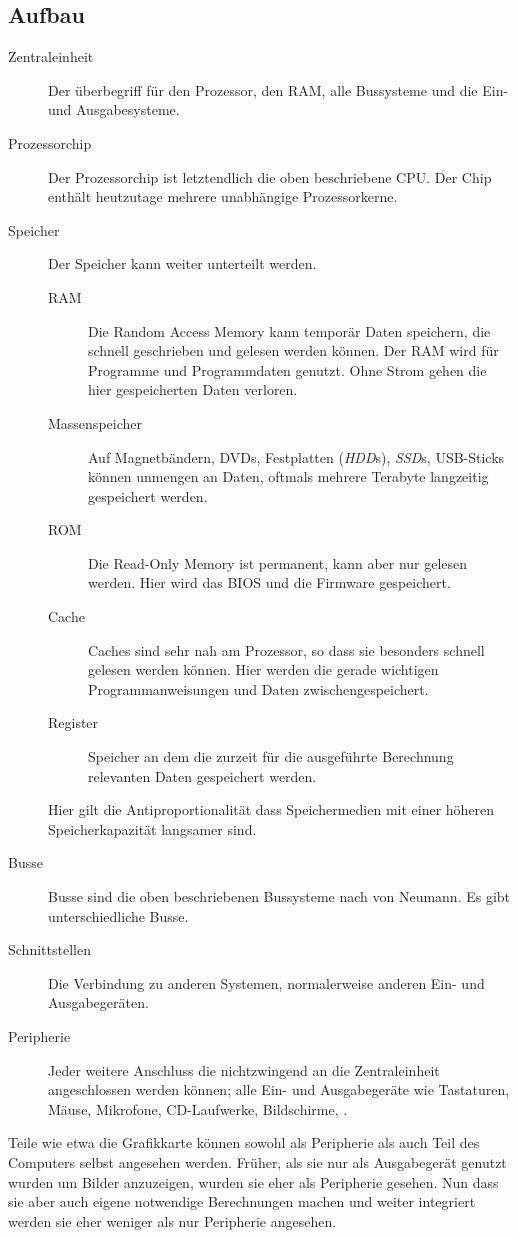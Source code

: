\documentclass{article}
\begin{document}
\subsection{Aufbau}
\begin{description}
 \item[Zentraleinheit] Der überbegriff für den Prozessor, den RAM, alle Bussysteme und die Ein- und Ausgabesysteme.
 \item[Prozessorchip] Der Prozessorchip ist letztendlich die oben beschriebene CPU. Der Chip enthält heutzutage mehrere unabhängige Prozessorkerne.
 \item[Speicher] Der Speicher kann weiter unterteilt werden.
 \begin{description}
  \item[RAM] Die Random Access Memory kann temporär Daten speichern, die schnell geschrieben und gelesen werden können. Der RAM wird \idr für Programme und Programmdaten genutzt. Ohne Strom gehen die hier gespeicherten Daten verloren.
  \item[Massenspeicher] Auf Magnetbändern, DVDs, Festplatten (\emph{HDD}s), \emph{SSD}s, USB-Sticks \etc können unmengen an Daten, oftmals mehrere Terabyte langzeitig gespeichert werden.
  \item[ROM] Die Read-Only Memory ist permanent, kann aber nur gelesen werden. Hier wird das BIOS und die Firmware gespeichert.
  \item[Cache] Caches sind sehr nah am Prozessor, so dass sie besonders schnell gelesen werden können. Hier werden die gerade wichtigen Programmanweisungen und Daten zwischengespeichert.
  \item[Register] Speicher an dem die zurzeit für die ausgeführte Berechnung relevanten Daten gespeichert werden. 
 \end{description}
 Hier gilt die Antiproportionalität dass Speichermedien mit einer höheren Speicherkapazität langsamer sind.
 \item[Busse] Busse sind die oben beschriebenen Bussysteme nach von Neumann. Es gibt unterschiedliche Busse.
 \item[Schnittstellen] Die Verbindung zu anderen Systemen, normalerweise anderen Ein- und Ausgabegeräten.
 \item[Peripherie] Jeder weitere Anschluss die nichtzwingend an die Zentraleinheit angeschlossen werden können; alle Ein- und Ausgabegeräte wie Tastaturen, Mäuse, Mikrofone, CD-Laufwerke, Bildschirme, \etc.
\end{description}
Teile wie etwa die Grafikkarte können sowohl als Peripherie als auch Teil des Computers selbst angesehen werden. Früher, als sie nur als Ausgabegerät genutzt wurden um Bilder anzuzeigen, wurden sie eher als Peripherie gesehen. Nun dass sie aber auch eigene notwendige Berechnungen machen und weiter integriert werden sie eher weniger als nur Peripherie angesehen. 
\end{document}
